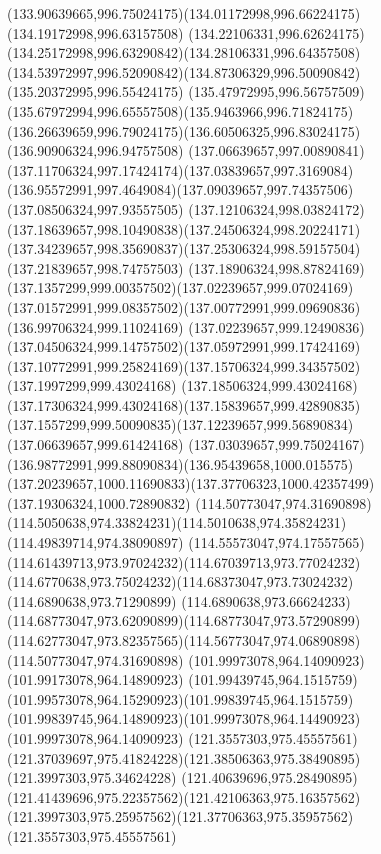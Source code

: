 {{  \curveto(133.90639665,996.75024175)(134.01172998,996.66224175)(134.19172998,996.63157508)
  \curveto(134.22106331,996.62624175)(134.25172998,996.63290842)(134.28106331,996.64357508)
  \curveto(134.53972997,996.52090842)(134.87306329,996.50090842)(135.20372995,996.55424175)
  \curveto(135.47972995,996.56757509)(135.67972994,996.65557508)(135.9463966,996.71824175)
  \curveto(136.26639659,996.79024175)(136.60506325,996.83024175)(136.90906324,996.94757508)
  \curveto(137.06639657,997.00890841)(137.11706324,997.17424174)(137.03839657,997.3169084)
  \curveto(136.95572991,997.4649084)(137.09039657,997.74357506)(137.08506324,997.93557505)
  \curveto(137.12106324,998.03824172)(137.18639657,998.10490838)(137.24506324,998.20224171)
  \curveto(137.34239657,998.35690837)(137.25306324,998.59157504)(137.21839657,998.74757503)
  \curveto(137.18906324,998.87824169)(137.1357299,999.00357502)(137.02239657,999.07024169)
  \curveto(137.01572991,999.08357502)(137.00772991,999.09690836)(136.99706324,999.11024169)
  \curveto(137.02239657,999.12490836)(137.04506324,999.14757502)(137.05972991,999.17424169)
  \curveto(137.10772991,999.25824169)(137.15706324,999.34357502)(137.1997299,999.43024168)
  \curveto(137.18506324,999.43024168)(137.17306324,999.43024168)(137.15839657,999.42890835)
  \curveto(137.1557299,999.50090835)(137.12239657,999.56890834)(137.06639657,999.61424168)
  \curveto(137.03039657,999.75024167)(136.98772991,999.88090834)(136.95439658,1000.015575)
  \curveto(137.20239657,1000.11690833)(137.37706323,1000.42357499)(137.19306324,1000.72890832)
  \moveto(114.50773047,974.31690898)
  \curveto(114.5050638,974.33824231)(114.5010638,974.35824231)(114.49839714,974.38090897)
  \curveto(114.55573047,974.17557565)(114.61439713,973.97024232)(114.67039713,973.77024232)
  \curveto(114.6770638,973.75024232)(114.68373047,973.73024232)(114.6890638,973.71290899)
  \curveto(114.6890638,973.66624233)(114.68773047,973.62090899)(114.68773047,973.57290899)
  \curveto(114.62773047,973.82357565)(114.56773047,974.06890898)(114.50773047,974.31690898)
  \moveto(101.99973078,964.14090923)
  \lineto(101.99173078,964.14890923)
  \curveto(101.99439745,964.1515759)(101.99573078,964.15290923)(101.99839745,964.1515759)
  \curveto(101.99839745,964.14890923)(101.99973078,964.14490923)(101.99973078,964.14090923)
  \moveto(121.3557303,975.45557561)
  \curveto(121.37039697,975.41824228)(121.38506363,975.38490895)(121.3997303,975.34624228)
  \curveto(121.40639696,975.28490895)(121.41439696,975.22357562)(121.42106363,975.16357562)
  \curveto(121.3997303,975.25957562)(121.37706363,975.35957562)(121.3557303,975.45557561)
}}
